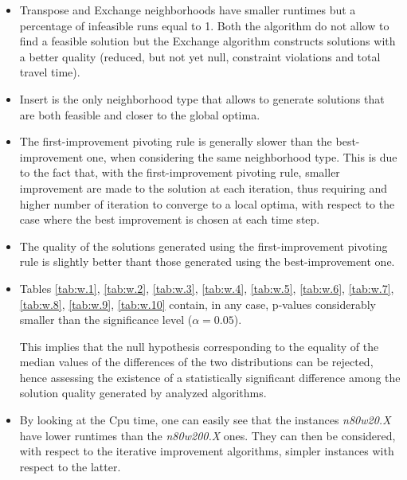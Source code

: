 \begin{homeworkProblem}
\begin{itemize}
\item Transpose and Exchange neighborhoods have smaller runtimes but a percentage of infeasible runs equal to 1. 
Both the algorithm do not allow to find a feasible solution but the Exchange algorithm constructs solutions with a better quality (reduced, but not yet null, constraint violations and total travel time).

\item Insert is the only neighborhood type that allows to generate solutions that are both feasible and closer to the global optima.

\item The first-improvement pivoting rule is generally slower than the best-improvement one, when considering the same neighborhood type.
This is due to the fact that, with the first-improvement pivoting rule, smaller improvement are made to the solution at each iteration, thus requiring and higher number of iteration to converge to a local optima, with respect to the case where the best improvement is chosen at each time step.

\item The quality of the solutions generated using the first-improvement pivoting rule is slightly better thant those generated using the best-improvement one.

\item Tables \ref{tab:w.1}, \ref{tab:w.2}, \ref{tab:w.3}, \ref{tab:w.4}, \ref{tab:w.5}, \ref{tab:w.6}, \ref{tab:w.7}, \ref{tab:w.8}, \ref{tab:w.9}, \ref{tab:w.10} contain, in any case, p-values considerably smaller than the significance level ($\alpha=0.05$). 

This implies that the null hypothesis corresponding to the equality of the median values of the differences of the two distributions can be rejected, hence assessing the existence of a statistically significant difference among the solution quality generated by analyzed algorithms.

\item By looking at the Cpu time, one can easily see that the instances \emph{n80w20.X} have lower runtimes than the \emph{n80w200.X} ones. They can then be considered, with respect to the iterative improvement algorithms, simpler instances with respect to the latter.

\end{itemize}

\end{homeworkProblem}		
